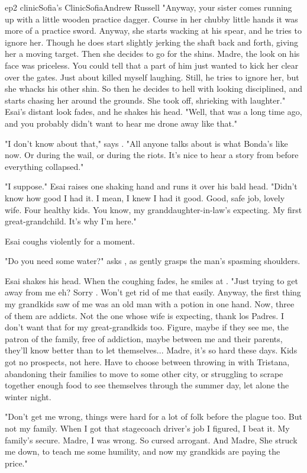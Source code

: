 \documentclass{book}
\begin{document}
\begin{node}{ep2 clinic}{Sofia's Clinic}{Sofia}{Andrew Russell}
    "Anyway, your sister comes running up with a
    little wooden practice dagger. Course in her chubby little hands it was more of a practice sword. Anyway, she starts wacking at his spear, and he tries to ignore her. Though he does start slightly jerking the shaft back and forth, giving her a moving
    target. Then she decides to go for the shins. Madre, the look on his face was priceless. You could tell that a part of him just wanted to kick her clear over the gates. Just about killed myself laughing. Still, he tries to ignore her, but she whacks his other
    shin. So then he decides to hell with looking disciplined, and starts chasing her around the grounds. She took off, shrieking with laughter." Esai's distant look fades, and he shakes his head. "Well, that was a long time ago, and you probably didn't want to hear 
    me drone away like that."

    "I don't know about that," says \name{}. "All anyone talks about is what Bonda's like now. Or during the wail, or during the riots. It's nice to hear a story from before everything collapsed."

    "I suppose." Esai raises one shaking hand and runs it over his bald head. "Didn't know how good I had it. I mean, I knew I had it good. Good, safe job, lovely wife. Four healthy kids. You know, my granddaughter-in-law's expecting. My first 
    great-grandchild. It's why I'm here."

    Esai coughs violently for a moment.

    "Do you need some water?" asks \name{}, as \heshe{} gently grasps the man's spasming shoulders.

    Esai shakes his head. When the coughing fades, he smiles at \himher{}. "Just trying to get away from me eh? Sorry \boygirl{}. Won't get rid of me that easily. Anyway, the first thing my grandkids saw of me was an old man with a potion in one hand. Now, three of 
    them
    are addicts. Not the one whose wife is expecting, thank los Padres. I don't want that for my great-grandkids too. Figure, maybe if they see me, the patron of the family, free of addiction, maybe 
    between me and their parents, they'll know better than to let themselves...
    Madre, it's so hard these days. Kids got no prospects, not here. Have to choose between throwing in with Tristana, abandoning their families to move to some other city, or struggling to scrape together enough food to see themselves through the summer day,
    let alone the winter night. 
    
    "Don't get me wrong, things were hard for a lot of folk before the plague too. But not my family. When I got that stagecoach driver's job I figured, I beat it. My family's secure. Madre, I was 
    wrong. So cursed arrogant. And Madre,
    She struck me down, to teach me some humility, and now my grandkids are paying the price."


\end{node}
\end{document}
